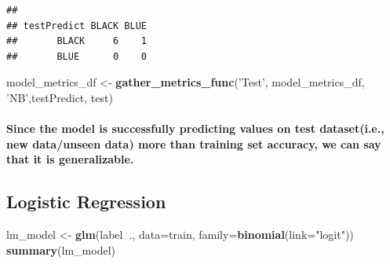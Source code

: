 \documentclass[
]{article}
\newenvironment{Shaded}{\begin{snugshade}}{\end{snugshade}}
\newcommand{\DataTypeTok}[1]{\textcolor[rgb]{0.13,0.29,0.53}{#1}}
\newcommand{\KeywordTok}[1]{\textcolor[rgb]{0.13,0.29,0.53}{\textbf{#1}}}
\newcommand{\NormalTok}[1]{#1}
\newcommand{\OperatorTok}[1]{\textcolor[rgb]{0.81,0.36,0.00}{\textbf{#1}}}
\newcommand{\StringTok}[1]{\textcolor[rgb]{0.31,0.60,0.02}{#1}}
\begin{document}
\begin{verbatim}
##            
## testPredict BLACK BLUE
##       BLACK     6    1
##       BLUE      0    0
\end{verbatim}

\begin{Shaded}
\begin{Highlighting}[]
\NormalTok{model_metrics_df <-}\StringTok{ }\KeywordTok{gather_metrics_func}\NormalTok{(}\StringTok{'Test'}\NormalTok{, model_metrics_df, }\StringTok{'NB'}\NormalTok{,testPredict, test)}
\end{Highlighting}
\end{Shaded}

\hypertarget{since-the-model-is-successfully-predicting-values-on-test-dataseti.e.-new-dataunseen-data-more-than-training-set-accuracy-we-can-say-that-it-is-generalizable.}{%
\paragraph{\texorpdfstring{\textbf{Since the model is successfully
predicting values on test dataset(i.e., new data/unseen data) more than
training set accuracy, we can say that it is
generalizable.}}{Since the model is successfully predicting values on test dataset(i.e., new data/unseen data) more than training set accuracy, we can say that it is generalizable.}}\label{since-the-model-is-successfully-predicting-values-on-test-dataseti.e.-new-dataunseen-data-more-than-training-set-accuracy-we-can-say-that-it-is-generalizable.}}

\hypertarget{logistic-regression}{%
\subsection{\texorpdfstring{\textbf{Logistic
Regression}}{Logistic Regression}}\label{logistic-regression}}

\begin{Shaded}
\begin{Highlighting}[]
\NormalTok{lm_model <-}\StringTok{ }\KeywordTok{glm}\NormalTok{(label}\OperatorTok{~}\NormalTok{., }\DataTypeTok{data=}\NormalTok{train, }\DataTypeTok{family=}\KeywordTok{binomial}\NormalTok{(}\DataTypeTok{link=}\StringTok{"logit"}\NormalTok{))}
\KeywordTok{summary}\NormalTok{(lm_model)}
\end{Highlighting}
\end{Shaded}
\end{document}
